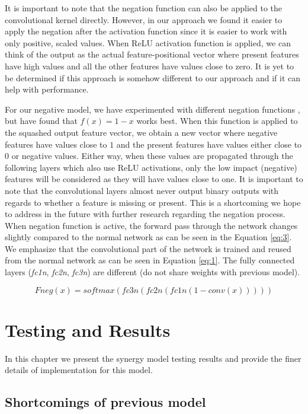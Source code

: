 \documentclass[b5paper]{book}
\let\cite\parencite
\begin{document}
It is important to note that the negation function can also be applied to the convolutional kernel directly. %
However, in our approach we found it easier to apply the negation after the activation function since it is easier to work with only positive, scaled values. When ReLU activation function is applied, we can think of the output as the actual feature-positional vector where present features have high values and all the other features have values close to zero. It is yet to be determined if this approach is somehow different to our approach and if it can help with performance.

For our negative model, we have experimented with different negation functions \cite{milovsevic2019classification}, but have found that \( f(x) = 1 - x \) works best. When this function is applied to the squashed output feature vector, we obtain a new vector where negative features have values close to \(1\) and the present features have values either close to \(0\) or negative values. Either way, when these values are propagated through the following layers which also use ReLU activations, only the low impact (negative) features will be considered as they will have values close to one. It is important to note that the convolutional layers almost never output binary outputs with regards to whether a feature is missing or present. This is a shortcoming we hope to address in the future with further research regarding the negation process. When negation function is active, the forward pass through the network changes slightly compared to the normal network as can be seen in the Equation \ref{eq:3}. We emphasize that the convolutional part of the network is trained and reused from the normal network as can be seen in Equation \ref{eq:1}. The fully connected layers (\emph{fc1n}, \emph{fc2n}, \emph{fc3n}) are different (do not share weights with previous model).

\begin{equation}\label{eq:3}
Fneg(x) = softmax(fc3n(fc2n(fc1n(1 - conv(x)))))
\end{equation}

\chapter{Testing and Results}

In this chapter we present the synergy model testing results and provide the finer details of implementation for this model.

\section{Shortcomings of previous model}
\label{shortcomings}
\end{document}
